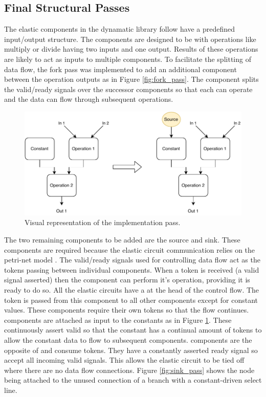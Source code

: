 \subsection{Final Structural Passes}
The elastic components in the dynamatic library follow have a predefined input/output structure. The components are designed to be with operations like multiply or divide having two inputs and one output. Results of these operations are likely to act as inputs to multiple components. To facilitate the splitting of data flow, the fork pass was implemented to add an additional component between the operation outputs as in Figure \ref{fig:fork_pass}. The  component splits the valid/ready signals over the successor components so that each can operate and the data can flow through subsequent operations.

\begin{figure}[htb!]
    \centering
    \includegraphics[width=\textwidth]{Images/source_pass.pdf}
    \caption{Visual representation of the  implementation pass.}
    \label{fig:source_pass}
\end{figure}

The two remaining components to be added are the source and sink. These components are required because the elastic circuit communication relies on the petri-net model \cite{petri}. The valid/ready signals used for controlling data flow act as the tokens passing between individual components. When a token is received (a valid signal asserted) then the component can perform it's operation, providing it is ready to do so. All the elastic circuits have a  at the head of the control flow. The token is passed from this component to all other components except for constant values. These components require their own tokens so that the flow continues.  components are attached as input to the constants as in Figure \ref{fig:source_pass}. These continuously assert valid so that the constant has a continual amount of tokens to allow the constant data to flow to subsequent components.  components are the opposite of  and consume tokens. They have a constantly asserted ready signal so accept all incoming valid signals. This allows the elastic circuit to be tied off where there are no data flow connections. Figure \ref{fig:sink_pass} shows the  node being attached to the unused connection of a branch with a constant-driven select line.

